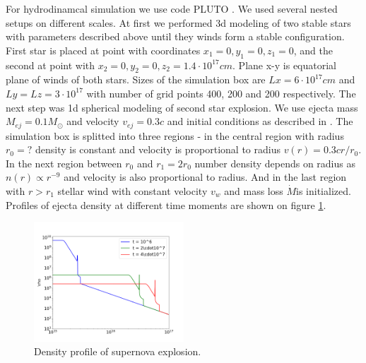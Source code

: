 \documentclass[a4paper,12pt]{extreport}
\begin{document}
For hydrodinamcal simulation we use code PLUTO \cite{MignonePluto}. We used several nested setups on different scales. At first we performed 3d modeling of two stable stars with parameters described above until they winds form a stable configuration. First star is placed at point with coordinates $x_1 = 0, y_1 = 0, z_1 = 0$, and the second at point with $x_2 = 0, y_2 = 0, z_2 = 1.4\cdot10^{17} cm$. Plane x-y is equatorial plane of winds of both stars. Sizes of the simulation box are $Lx = 6\cdot 10^{17} cm$ and $Ly = Lz = 3\cdot 10^{17}$ with number of grid points 400, 200 and 200 respectively. The next step was 1d spherical modeling of second star explosion. We use ejecta mass $M_{ej} = 0.1 M_\odot$ and velocity $v_{ej} = 0.3 c$ and initial conditions as described in \cite{Chevalier1982, Petruk2021snr}. The simulation box is splitted into three regions - in the central region with radius $r_0 = ?$ density is constant and velocity is proportional to radius $v(r) = 0.3 c r/r_0$. In the next region between $r_0$ and $r_1 = 2 r_0$ number density depends on radius as $n(r) \propto r^{-9}$ and velocity is also proportional to radius. And in the last region with $r > r_1$ stellar wind with constant velocity $v_w$ and mass loss $\dot{M}$is initialized. Profiles of ejecta density at different time moments are shown on figure \ref{snr}.
\begin{figure}
	\centering
	\includegraphics[width=0.5\textwidth]{./fig/snr.png} 
	\caption{Density profile of supernova explosion.}
	\label{snr}
\end{figure}
\end{document}
